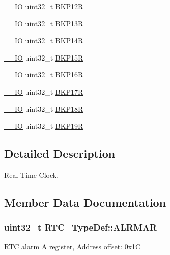 \begin{DoxyCompactItemize}
\item 
\hyperlink{core__sc300_8h_aec43007d9998a0a0e01faede4133d6be}{\+\_\+\+\_\+\+IO} uint32\+\_\+t \hyperlink{struct_r_t_c___type_def_a6606b5d249f923aa15ab74b382cbaf7e}{B\+K\+P12R}
\item 
\hyperlink{core__sc300_8h_aec43007d9998a0a0e01faede4133d6be}{\+\_\+\+\_\+\+IO} uint32\+\_\+t \hyperlink{struct_r_t_c___type_def_a138903d4681455a660dccbaf3409263d}{B\+K\+P13R}
\item 
\hyperlink{core__sc300_8h_aec43007d9998a0a0e01faede4133d6be}{\+\_\+\+\_\+\+IO} uint32\+\_\+t \hyperlink{struct_r_t_c___type_def_adaae50f5c3213014fb9818eaee389676}{B\+K\+P14R}
\item 
\hyperlink{core__sc300_8h_aec43007d9998a0a0e01faede4133d6be}{\+\_\+\+\_\+\+IO} uint32\+\_\+t \hyperlink{struct_r_t_c___type_def_a797f43f9cc1858baebd1799be288dff6}{B\+K\+P15R}
\item 
\hyperlink{core__sc300_8h_aec43007d9998a0a0e01faede4133d6be}{\+\_\+\+\_\+\+IO} uint32\+\_\+t \hyperlink{struct_r_t_c___type_def_a181ad73082bde7d74010aac16bd373fc}{B\+K\+P16R}
\item 
\hyperlink{core__sc300_8h_aec43007d9998a0a0e01faede4133d6be}{\+\_\+\+\_\+\+IO} uint32\+\_\+t \hyperlink{struct_r_t_c___type_def_a90a305a8e00b357f28daef5041e5a8b1}{B\+K\+P17R}
\item 
\hyperlink{core__sc300_8h_aec43007d9998a0a0e01faede4133d6be}{\+\_\+\+\_\+\+IO} uint32\+\_\+t \hyperlink{struct_r_t_c___type_def_a171288f82cab2623832de779fb435d74}{B\+K\+P18R}
\item 
\hyperlink{core__sc300_8h_aec43007d9998a0a0e01faede4133d6be}{\+\_\+\+\_\+\+IO} uint32\+\_\+t \hyperlink{struct_r_t_c___type_def_a993f54e8feff9254f795dfd3e000fc55}{B\+K\+P19R}
\end{DoxyCompactItemize}


\subsection{Detailed Description}
Real-\/\+Time Clock. 

\subsection{Member Data Documentation}
\subsubsection[{\texorpdfstring{A\+L\+R\+M\+AR}{ALRMAR}}]{ uint32\+\_\+t R\+T\+C\+\_\+\+Type\+Def\+::\+A\+L\+R\+M\+AR}\hypertarget{struct_r_t_c___type_def_ad7e54d5c5a4b9fd1e26aca85b1e36c7f}{}\label{struct_r_t_c___type_def_ad7e54d5c5a4b9fd1e26aca85b1e36c7f}
R\+TC alarm A register, Address offset\+: 0x1C 
